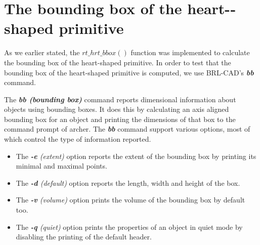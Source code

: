 \clearpage



\section{The bounding box of the heart-­shaped primitive}

As   we   earlier   stated,   the   $rt\_hrt\_bbox()$   function   was   implemented   to
 calculate   the   bounding   box   of   the   heart-­shaped   primitive.   In   order   to   test   that  
the   bounding   box   of   the   heart-­shaped   primitive   is   computed,   we   use  
BRL­-CAD's \textit{\textbf{bb}} \cite{39} command.

\hspace{30} The   \textit{\textbf{bb (bounding box)}}  command   reports   dimensional   information   about   objects   using  
bounding   boxes.   It   does   this   by   calculating   an   axis ­aligned   bounding   box   for   an  
object   and   printing   the   dimensions   of   that   box   to   the   command   prompt   of  
archer.   The   \textit{\textbf{bb}}   command   support   various   options,   most   of   which   control   the  
type of information reported.  

\begin{itemize}
\item The \textit{\textbf{-­e} (extent)} option reports the extent of the bounding box by printing its minimal and maximal points.  
\item The \textit{\textbf{-­d} (default)} option reports the length, width and height of the box.  
\item The \textit{\textbf{-­v} (volume)} option prints the volume of the bounding box by default too.  
\item The \textit{\textbf{-­q} (quiet)} option prints the properties of an object in quiet mode by disabling the printing of the default header.
\end{itemize}

